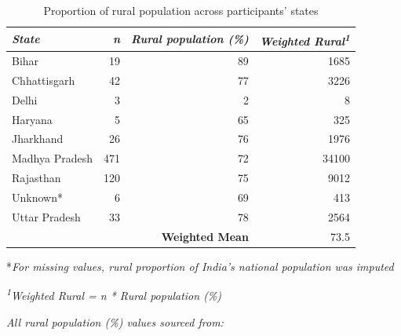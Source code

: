 \documentclass[empirical, authordate, issue]{jote-new-article}
\begin{document}
\begin{table}

  \caption{Proportion of rural population across participants' states }
  \label{tab:tableS39}


  \begin{tabularx}{\linewidth}{@{} X  r  r  r@{}}



    \toprule
    \emph{State}   & \emph{n} & \emph{Rural population (\%)} & \emph{Weighted Rural}\textsuperscript{\emph{1}} \\

    \midrule
    Bihar          & 19       & 89                           & 1685                                            \\
    Chhattisgarh   & 42       & 77                           & 3226                                            \\
    Delhi          & 3        & 2                            & 8                                               \\
    Haryana        & 5        & 65                           & 325                                             \\
    Jharkhand      & 26       & 76                           & 1976                                            \\
    Madhya Pradesh & 471      & 72                           & 34100                                           \\
    Rajasthan      & 120      & 75                           & 9012                                            \\
    Unknown*       & 6        & 69                           & 413                                             \\
    Uttar Pradesh  & 33       & 78                           & 2564                                            \\
                   &          & \textbf{Weighted Mean}       & 73.5                                            \\
  \end{tabularx}

  *\emph{For missing values, rural proportion of India's national population was imputed }

  \textsuperscript{\emph{1}}\emph{Weighted Rural = n * Rural population (\%)}

  \emph{All rural population (\%) values sourced from: }\emph{ }

\end{table}
\end{document}
